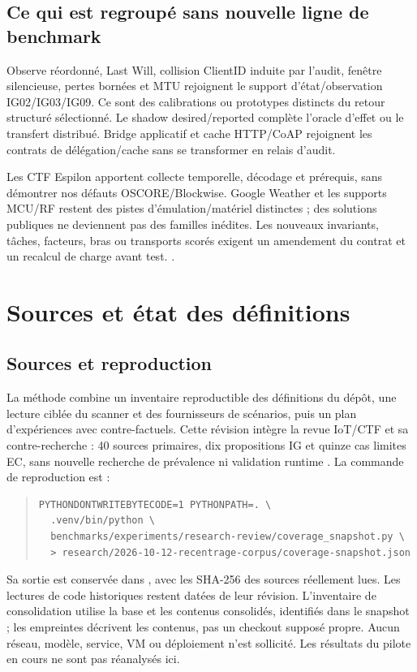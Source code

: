 \documentclass[11pt,a4paper]{article}
\newcommand{\code}[1]{{\small\ttfamily\path{#1}}}
\newcommand{\scenariolink}[1]{\hyperref[scenario:#1]{\code{#1}}}
\begin{document}
\subsection{Ce qui est regroupé sans nouvelle ligne de benchmark}

Observe réordonné, Last Will, collision ClientID induite par l'audit, fenêtre silencieuse, pertes bornées et MTU rejoignent le support d'état/observation IG02/IG03/IG09. Ce sont des calibrations ou prototypes distincts du retour structuré \scenariolink{s_mqtt_reprise} sélectionné. Le shadow desired/reported complète l'oracle d'effet ou le transfert distribué. Bridge applicatif et cache HTTP/CoAP rejoignent les contrats de délégation/cache sans se transformer en relais d'audit.

Les CTF Espilon apportent collecte temporelle, décodage et prérequis, sans démontrer nos défauts OSCORE/Blockwise. Google Weather et les supports MCU/RF restent des pistes d'émulation/matériel distinctes ; des solutions publiques ne deviennent pas des familles inédites. Les nouveaux invariants, tâches, facteurs, bras ou transports scorés exigent un amendement du contrat et un recalcul de charge avant test. \cite{iotreview}.

\section{Sources et état des définitions}\label{sec:sources}
\subsection{Sources et reproduction}

La méthode combine un inventaire reproductible des définitions du dépôt, une lecture ciblée du scanner et des fournisseurs de scénarios, puis un plan d'expériences avec contre-factuels. Cette révision intègre la revue IoT/CTF et sa contre-recherche : 40 sources primaires, dix propositions IG et quinze cas limites EC, sans nouvelle recherche de prévalence ni validation runtime \cite{iotreview}. La commande de reproduction est :
\begin{quote}\begin{minipage}{\linewidth}\small
\begin{verbatim}
PYTHONDONTWRITEBYTECODE=1 PYTHONPATH=. \
  .venv/bin/python \
  benchmarks/experiments/research-review/coverage_snapshot.py \
  > research/2026-10-12-recentrage-corpus/coverage-snapshot.json
\end{verbatim}
\end{minipage}\end{quote}
Sa sortie est conservée dans \code{coverage-snapshot.json}, avec les SHA-256 des sources réellement lues. Les lectures de code historiques restent datées de leur révision. L’inventaire de consolidation utilise la base \code{6eecf19} et les contenus consolidés, identifiés dans le snapshot ; les empreintes décrivent les contenus, pas un checkout supposé propre. Aucun réseau, modèle, service, VM ou déploiement n'est sollicité. Les résultats du pilote en cours ne sont pas réanalysés ici.
\end{document}
